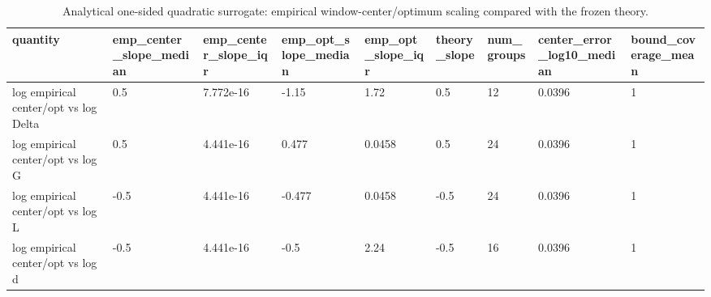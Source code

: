 \begin{table}[t]
\centering
\small
\begin{tabular}{lllllllll}
\toprule
quantity & emp\_center\_slope\_median & emp\_center\_slope\_iqr & emp\_opt\_slope\_median & emp\_opt\_slope\_iqr & theory\_slope & num\_groups & center\_error\_log10\_median & bound\_coverage\_mean \\
\midrule
log empirical center/opt vs log Delta & 0.5 & 7.772e-16 & -1.15 & 1.72 & 0.5 & 12 & 0.0396 & 1 \\
log empirical center/opt vs log G & 0.5 & 4.441e-16 & 0.477 & 0.0458 & 0.5 & 24 & 0.0396 & 1 \\
log empirical center/opt vs log L & -0.5 & 4.441e-16 & -0.477 & 0.0458 & -0.5 & 24 & 0.0396 & 1 \\
log empirical center/opt vs log d & -0.5 & 4.441e-16 & -0.5 & 2.24 & -0.5 & 16 & 0.0396 & 1 \\
\bottomrule
\end{tabular}
\caption{Analytical one-sided quadratic surrogate: empirical window-center/optimum scaling compared with the frozen theory.}
\label{tab:analytic_window}
\end{table}
